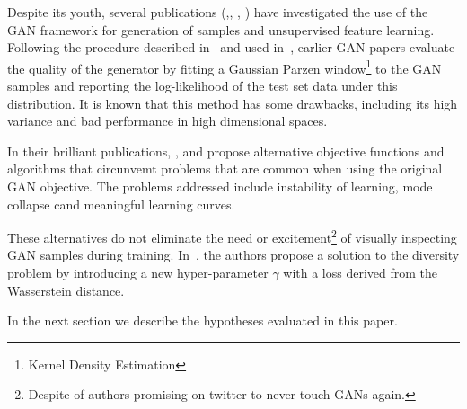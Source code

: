 Despite its youth, several publications (\cite{arjovsky2017towards},\cite{salimans2016improved},
\cite{zhao2016energy}, \cite{radford2015unsupervised}) have investigated the use of the
GAN framework for generation of samples and unsupervised feature learning. 
Following the procedure described in~\cite{breuleux2011quickly} and
used in~\cite{goodfellow2014generative}, earlier GAN papers evaluate
the quality of the generator by fitting a Gaussian Parzen window\footnote{Kernel
Density Estimation} to the GAN samples and reporting the log-likelihood of the
test set data under this distribution. It is known that this method has some drawbacks, 
including its high variance and bad performance in high dimensional spaces. 

In their brilliant publications, \cite{mao2016least},
\cite{arjovsky2017wasserstein} and \cite{gulrajani2017improved} propose alternative
objective functions and algorithms that circunvemt problems that are common when using the
original GAN objective. The problems addressed include instability of learning,
mode collapse cand meaningful learning curves. 

These alternatives do not eliminate the need or excitement\footnote{Despite of
authors promising on twitter to never touch GANs again.} 
of visually inspecting GAN samples during training.
In~\cite{berthelot2017began}, the authors propose a solution to the diversity
problem by introducing a new hyper-parameter $\gamma$ with a loss derived from
the Wasserstein distance. 




In the next section we describe the hypotheses evaluated in this paper.
